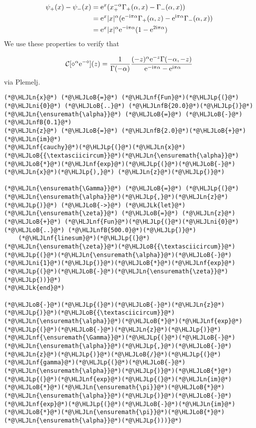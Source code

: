 \documentclass[12pt,landscape]{article}
\newcommand{\HLJLk}[1]{\textcolor[RGB]{148,91,176}{\textbf{#1}}}
\newcommand{\HLJLn}[1]{#1}
\newcommand{\HLJLnf}[1]{\textcolor[RGB]{66,102,213}{#1}}
\newcommand{\HLJLnfB}[1]{\textcolor[RGB]{59,151,46}{#1}}
\newcommand{\HLJLni}[1]{\textcolor[RGB]{59,151,46}{#1}}
\newcommand{\HLJLoB}[1]{\textcolor[RGB]{102,102,102}{\textbf{#1}}}
\newcommand{\HLJLp}[1]{#1}
\def\I{ {\rm i} }
\def\E{ {\rm e} }
\def\CC{ {\cal C} }
\def\addtab#1={#1\;&=}
\def\ccr{\\\addtab}
\def\addtab#1={#1\;&=}
\def\ccr{\\\addtab}
\begin{document}
{\begin{itemize}
\end{itemize}

\begin{align*}
\psi_+(x) - \psi_-(x) &= \E^x(x_+^{-\alpha} \Gamma_+(\alpha, x) -  \Gamma_-(\alpha, x)) \ccr
= \E^x |x|^\alpha (\E^{-\I \pi \alpha} \Gamma_+(\alpha, z) - \E^{\I \pi \alpha} \Gamma_-(\alpha,x)) \ccr
 = \E^x |x|^\alpha \E^{-\I \pi \alpha} (1-\E^{2 \I \pi \alpha})
\end{align*}
We use these properties to verify that

\[
\CC[\diamond^\alpha \E^{-\diamond}](z) = {1 \over \Gamma(-\alpha)} {(-z)^\alpha \E^{-z} \Gamma(-\alpha, - z) \over
  \E^{-\I\pi\alpha} - \E^{\I\pi\alpha}}
\]
via Plemelj.


\begin{lstlisting}
(*@\HLJLn{x}@*) (*@\HLJLoB{=}@*) (*@\HLJLnf{Fun}@*)(*@\HLJLp{(}@*)(*@\HLJLni{0}@*) (*@\HLJLoB{..}@*) (*@\HLJLnfB{20.0}@*)(*@\HLJLp{)}@*)
(*@\HLJLn{\ensuremath{\alpha}}@*) (*@\HLJLoB{=}@*) (*@\HLJLoB{-}@*)(*@\HLJLnfB{0.1}@*)
(*@\HLJLn{z}@*) (*@\HLJLoB{=}@*) (*@\HLJLnfB{2.0}@*)(*@\HLJLoB{+}@*)(*@\HLJLn{im}@*)
(*@\HLJLnf{cauchy}@*)(*@\HLJLp{(}@*)(*@\HLJLn{x}@*)(*@\HLJLoB{{\textasciicircum}}@*)(*@\HLJLn{\ensuremath{\alpha}}@*)(*@\HLJLoB{*}@*)(*@\HLJLnf{exp}@*)(*@\HLJLp{(}@*)(*@\HLJLoB{-}@*)(*@\HLJLn{x}@*)(*@\HLJLp{),}@*) (*@\HLJLn{z}@*)(*@\HLJLp{)}@*)

(*@\HLJLn{\ensuremath{\Gamma}}@*) (*@\HLJLoB{=}@*) (*@\HLJLp{(}@*)(*@\HLJLn{\ensuremath{\alpha}}@*)(*@\HLJLp{,}@*)(*@\HLJLn{z}@*)(*@\HLJLp{)}@*) (*@\HLJLoB{->}@*) (*@\HLJLk{let}@*) (*@\HLJLn{\ensuremath{\zeta}}@*) (*@\HLJLoB{=}@*) (*@\HLJLn{z}@*) (*@\HLJLoB{+}@*) (*@\HLJLnf{Fun}@*)(*@\HLJLp{(}@*)(*@\HLJLni{0}@*) (*@\HLJLoB{..}@*) (*@\HLJLnfB{500.0}@*)(*@\HLJLp{)}@*)
    (*@\HLJLnf{linesum}@*)(*@\HLJLp{(}@*)(*@\HLJLn{\ensuremath{\zeta}}@*)(*@\HLJLoB{{\textasciicircum}}@*)(*@\HLJLp{(}@*)(*@\HLJLn{\ensuremath{\alpha}}@*)(*@\HLJLoB{-}@*)(*@\HLJLni{1}@*)(*@\HLJLp{)}@*)(*@\HLJLoB{*}@*)(*@\HLJLnf{exp}@*)(*@\HLJLp{(}@*)(*@\HLJLoB{-}@*)(*@\HLJLn{\ensuremath{\zeta}}@*)(*@\HLJLp{))}@*)
(*@\HLJLk{end}@*)

(*@\HLJLoB{-}@*)(*@\HLJLp{(}@*)(*@\HLJLoB{-}@*)(*@\HLJLn{z}@*)(*@\HLJLp{)}@*)(*@\HLJLoB{{\textasciicircum}}@*)(*@\HLJLn{\ensuremath{\alpha}}@*)(*@\HLJLoB{*}@*)(*@\HLJLnf{exp}@*)(*@\HLJLp{(}@*)(*@\HLJLoB{-}@*)(*@\HLJLn{z}@*)(*@\HLJLp{)}@*)(*@\HLJLnf{\ensuremath{\Gamma}}@*)(*@\HLJLp{(}@*)(*@\HLJLoB{-}@*)(*@\HLJLn{\ensuremath{\alpha}}@*)(*@\HLJLp{,}@*)(*@\HLJLoB{-}@*)(*@\HLJLn{z}@*)(*@\HLJLp{)}@*)(*@\HLJLoB{/}@*)(*@\HLJLp{(}@*)(*@\HLJLnf{gamma}@*)(*@\HLJLp{(}@*)(*@\HLJLoB{-}@*)(*@\HLJLn{\ensuremath{\alpha}}@*)(*@\HLJLp{)}@*)(*@\HLJLoB{*}@*)(*@\HLJLp{(}@*)(*@\HLJLnf{exp}@*)(*@\HLJLp{(}@*)(*@\HLJLn{im}@*)(*@\HLJLoB{*}@*)(*@\HLJLn{\ensuremath{\pi}}@*)(*@\HLJLoB{*}@*)(*@\HLJLn{\ensuremath{\alpha}}@*)(*@\HLJLp{)}@*)(*@\HLJLoB{-}@*)(*@\HLJLnf{exp}@*)(*@\HLJLp{(}@*)(*@\HLJLoB{-}@*)(*@\HLJLn{im}@*)(*@\HLJLoB{*}@*)(*@\HLJLn{\ensuremath{\pi}}@*)(*@\HLJLoB{*}@*)(*@\HLJLn{\ensuremath{\alpha}}@*)(*@\HLJLp{)))}@*)
\end{lstlisting}

}
\end{document}
